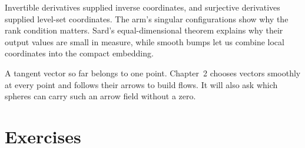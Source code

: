 Invertible derivatives supplied inverse coordinates, and surjective derivatives supplied level-set coordinates. The arm's singular configurations show why the rank condition matters. Sard's equal-dimensional theorem explains why their output values are small in measure, while smooth bumps let us combine local coordinates into the compact embedding.

A tangent vector so far belongs to one point. Chapter~2 chooses vectors smoothly at every point and follows their arrows to build flows. It will also ask which spheres can carry such an arrow field without a zero.

\section{Exercises}

